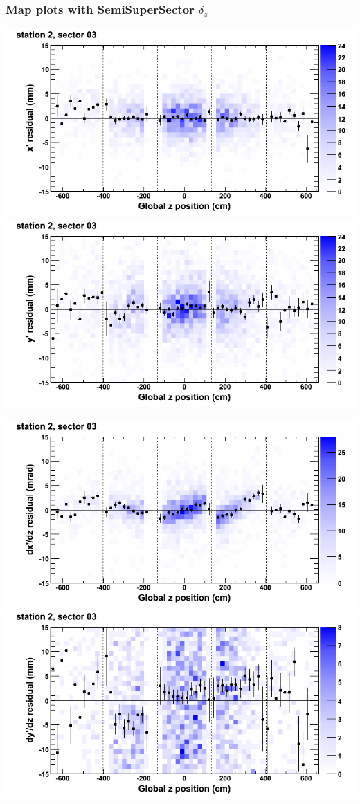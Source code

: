 \documentclass[compress]{beamer}
\begin{document}
\begin{frame}
\frametitle{Map plots with SemiSuperSector $\delta_z$}
\includegraphics[width=0.5\linewidth]{zfit_mapplots/DTvsz_st2sec03_x.png}
\includegraphics[width=0.5\linewidth]{zfit_mapplots/DTvsz_st2sec03_y.png}

\includegraphics[width=0.5\linewidth]{zfit_mapplots/DTvsz_st2sec03_dxdz.png}
\includegraphics[width=0.5\linewidth]{zfit_mapplots/DTvsz_st2sec03_dydz.png}
\end{frame}
\end{document}
